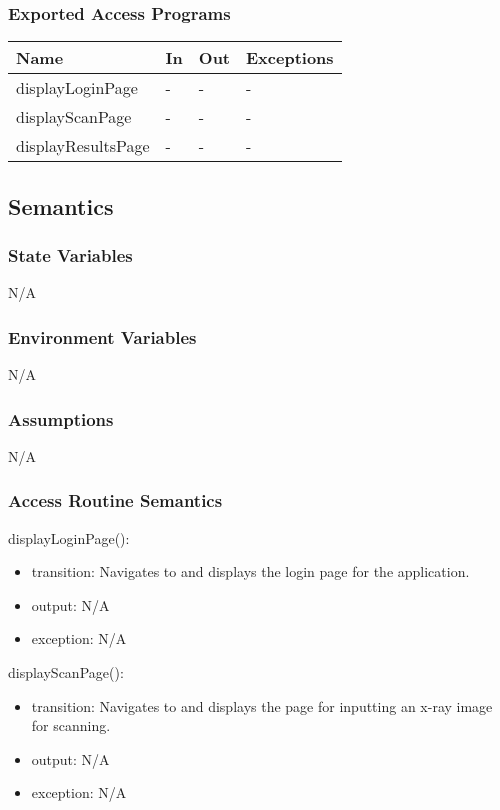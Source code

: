 \documentclass[12pt, titlepage]{article}
\begin{document}
\subsubsection{Exported Access Programs}

\begin{center}
  \begin{tabular}{p{4cm} p{3cm} p{3cm} p{3cm}}
    \hline
    \textbf{Name} & \textbf{In} & \textbf{Out} & \textbf{Exceptions} \\
    \hline
    displayLoginPage & - & - & - \\
    displayScanPage & - & - & - \\
    displayResultsPage & - & - & - \\
    \hline
  \end{tabular}
\end{center}

\subsection{Semantics}

\subsubsection{State Variables}
N/A

\subsubsection{Environment Variables}
N/A

\subsubsection{Assumptions}
N/A

\subsubsection{Access Routine Semantics}

\noindent displayLoginPage():
\begin{itemize}
  \item transition: Navigates to and displays the login page for the
    application.
  \item output: N/A 
  \item exception: N/A
\end{itemize}

\noindent displayScanPage():
\begin{itemize}
  \item transition: Navigates to and displays the page for inputting an x-ray
    image for scanning.
  \item output: N/A
  \item exception: N/A
\end{itemize}
\end{document}
